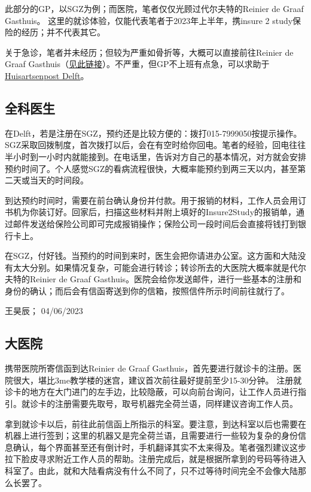 此部分的GP，以SGZ为例；而医院，笔者仅仅光顾过代尔夫特的Reinier de Graaf Gasthuis。 这里的就诊体验，仅能代表笔者于2023年上半年，携insure 2 study保险的经历；并不代表其它。

关于急诊，笔者并未经历；但较为严重如骨折等，大概可以直接前往Reinier de Graaf Gasthuis（\href{https://reinierdegraaf.nl/specialisme/spoedeisende-hulp}{\uline{见此链接}}）。不严重，但GP不上班有点急，可以求助于\href{https://hapschievliet.nl/language/english/}{\uline{Huisartsenpost Delft}}。


\subsection{全科医生}
在Delft，若是注册在SGZ，预约还是比较方便的：拨打015-7999050按提示操作。SGZ采取回拨制度，首次拨打以后，会在有空时给你回电。笔者的经验，回电往往半小时到一小时内就能接到。在电话里，告诉对方自己的基本情况，对方就会安排预约时间了。个人感觉SGZ的看病流程很快，大概率能预约到两三天以内，甚至第二天或当天的时间段。

到达预约时间时，需要在前台确认身份并付款。用于报销的材料，工作人员会用订书机为你装订好。回家后，扫描这些材料并附上填好的Insure2Study的报销单，通过邮件发送给保险公司即可完成报销操作；保险公司一段时间后会直接将钱打到银行卡上。

在SGZ，付好钱。当预约的时间到来时，医生会把你请进办公室。这方面和大陆没有太大分别。如果情况复杂，可能会进行转诊；转诊所去的大医院大概率就是代尔夫特的Reinier de Graaf Gasthuis。医院会给你发送邮件，进行一些基本的注册和身份的确认；而后会有信函寄送到你的信箱，按照信件所示时间前往就行了。
\begin{flushright}
王昊辰； 04/06/2023
\end{flushright}

\subsection{大医院}
携带医院所寄信函到达Reinier de Graaf Gasthuis，首先要进行就诊卡的注册。医院很大，堪比3me教学楼的迷宫，建议首次前往最好提前至少15-30分钟。 注册就诊卡的地方在大门进门的左手边，比较隐蔽，可以向前台询问，让工作人员进行指引。就诊卡的注册需要先取号，取号机器完全荷兰语，同样建议咨询工作人员。

拿到就诊卡以后，前往此前信函上所指示的科室。要注意，到达科室以后也需要在机器上进行签到；这里的机器又是完全荷兰语，且需要进行一些较为复杂的身份信息确认，每个界面甚至还有倒计时，手机翻译其实不太来得及。笔者强烈建议这步拉下脸皮寻求附近工作人员的帮助。注册完成后，就是根据所拿到的号码等待进入科室了。由此，就和大陆看病没有什么不同了，只不过等待时间完全不会像大陆那么长罢了。

